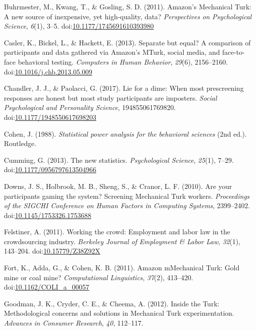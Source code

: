 \documentclass[english,man]{apa6}
\theoremstyle{definition}
\theoremstyle{definition}
\theoremstyle{definition}
\theoremstyle{remark}
\begin{document}
\hypertarget{ref-Buhrmester2011}{}
Buhrmester, M., Kwang, T., \& Gosling, S. D. (2011). Amazon's Mechanical
Turk: A new source of inexpensive, yet high-quality, data?
\emph{Perspectives on Psychological Science}, \emph{6}(1), 3--5.
doi:\href{https://doi.org/10.1177/1745691610393980}{10.1177/1745691610393980}

\hypertarget{ref-Casler2013}{}
Casler, K., Bickel, L., \& Hackett, E. (2013). Separate but equal? A
comparison of participants and data gathered via Amazon's MTurk, social
media, and face-to-face behavioral testing. \emph{Computers in Human
Behavior}, \emph{29}(6), 2156--2160.
doi:\href{https://doi.org/10.1016/j.chb.2013.05.009}{10.1016/j.chb.2013.05.009}

\hypertarget{ref-Chandler2017}{}
Chandler, J. J., \& Paolacci, G. (2017). Lie for a dime: When most
prescreening responses are honest but most study participants are
imposters. \emph{Social Psychological and Personality Science},
194855061769820.
doi:\href{https://doi.org/10.1177/1948550617698203}{10.1177/1948550617698203}

\hypertarget{ref-Cohen1988}{}
Cohen, J. (1988). \emph{Statistical power analysis for the behavioral
sciences} (2nd ed.). Routledge.

\hypertarget{ref-Cumming2013}{}
Cumming, G. (2013). The new statistics. \emph{Psychological Science},
\emph{25}(1), 7--29.
doi:\href{https://doi.org/10.1177/0956797613504966}{10.1177/0956797613504966}

\hypertarget{ref-Downs2010}{}
Downs, J. S., Holbrook, M. B., Sheng, S., \& Cranor, L. F. (2010). Are
your participants gaming the system? Screening Mechanical Turk workers.
\emph{Proceedings of the SIGCHI Conference on Human Factors in Computing
Systems}, 2399--2402.
doi:\href{https://doi.org/10.1145/1753326.1753688}{10.1145/1753326.1753688}

\hypertarget{ref-Felstiner2011}{}
Felstiner, A. (2011). Working the crowd: Employment and labor law in the
crowdsourcing industry. \emph{Berkeley Journal of Employment \& Labor
Law}, \emph{32}(1), 143--204.
doi:\href{https://doi.org/10.15779/Z38Z92X}{10.15779/Z38Z92X}

\hypertarget{ref-Fort2011}{}
Fort, K., Adda, G., \& Cohen, K. B. (2011). Amazon mMechanical Turk:
Gold mine or coal mine? \emph{Computational Linguistics}, \emph{37}(2),
413--420.
doi:\href{https://doi.org/10.1162/COLI_a_00057}{10.1162/COLI\_a\_00057}

\hypertarget{ref-Goodman2012}{}
Goodman, J. K., Cryder, C. E., \& Cheema, A. (2012). Inside the Turk:
Methodological concerns and solutions in Mechanical Turk
experimentation. \emph{Advances in Consumer Research}, \emph{40},
112--117.
\end{document}
